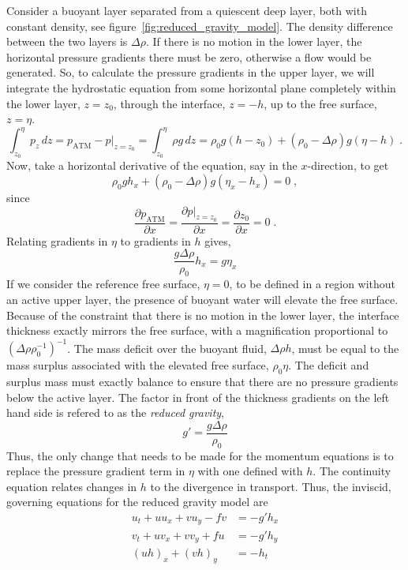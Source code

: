 \documentclass[11pt]{report}
\numberwithin{equation}{section}
\begin{document}
Consider a buoyant layer separated from a quiescent deep layer, both with constant density, see figure~\ref{fig:reduced_gravity_model}.  The density difference between the two layers is $\Delta\rho$.  If there is no motion in the lower layer, the horizontal pressure gradients there must be zero, otherwise a flow would be generated.  So, to calculate the pressure gradients in the upper layer, we will integrate the hydrostatic equation from some horizontal plane completely within the lower layer, $z=z_0$, through the interface, $z=-h$, up to the free surface, $z=\eta$.
\begin{equation}
    \int_{z_0}^{\eta} p_z \, dz = p_{\mathrm{ATM}} - p|_{z=z_0} = \int_{z_0}^{\eta} \rho g \, dz = 
        \rho_0 g (h - z_0) + (\rho_0-\Delta\rho) g (\eta - h) \;.
\end{equation}
Now, take a horizontal derivative of the equation, say in the $x$-direction, to get
\begin{equation}
     \rho_0 g h_x + (\rho_0-\Delta\rho) g (\eta_x - h_x) = 0 \; ,
\end{equation}
since
\begin{equation}
    \frac{\partial p_{\mathrm{ATM}}}{\partial x} = \frac{\partial p|_{z=z_0}}{\partial x} =
    \frac{\partial z_0}{\partial x} = 0 \; .
\end{equation}
Relating gradients in $\eta$ to gradients in $h$ gives,
\begin{equation}
    \frac{g \Delta\rho}{\rho_0} h_x = g \eta_x
\end{equation}
If we consider the reference free surface, $\eta = 0$, to be defined in a region without an active upper layer, the presence of buoyant water will elevate the free surface.  Because of the constraint that there is no motion in the lower layer, the interface thickness exactly mirrors the free surface, with a magnification proportional to $(\Delta\rho \rho_0^{-1})^{-1}$.  The mass deficit over the buoyant fluid, $\Delta\rho h$, must be equal to the mass surplus associated with the elevated free surface, $\rho_0 \eta$.  The deficit and surplus mass must exactly balance to ensure that there are no pressure gradients below the active layer.  The factor in front of the thickness gradients on the left hand side is refered to as the \emph{reduced gravity},
\begin{equation}
    g' = \frac{g \Delta\rho}{\rho_0}
\end{equation}
Thus, the only change that needs to be made for the momentum equations is to replace the pressure gradient term in $\eta$ with one defined with $h$.  The continuity equation relates changes in $h$ to the divergence in transport.  Thus, the inviscid, governing equations for the reduced gravity model are
\begin{align}
    u_t + u u_x + v u_y - f v &= -g' h_x \\
    v_t + u v_x + v v_y + fu &= -g' h_y  \\
    (u h)_x + (v h)_y &= -h_t
\end{align}
\end{document}
